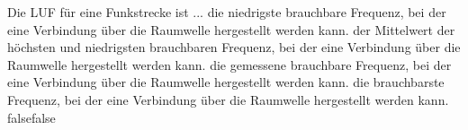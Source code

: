     {Die LUF für eine Funkstrecke ist ...}
    {die niedrigste brauchbare Frequenz, bei der eine Verbindung über die Raumwelle hergestellt werden kann.}
    {der Mittelwert der höchsten und niedrigsten brauchbaren Frequenz, bei der eine Verbindung über die Raumwelle hergestellt werden kann.}
    {die gemessene brauchbare Frequenz, bei der eine Verbindung über die Raumwelle hergestellt werden kann.}
    {die brauchbarste Frequenz, bei der eine Verbindung über die Raumwelle hergestellt werden kann.}
    {false}{false}